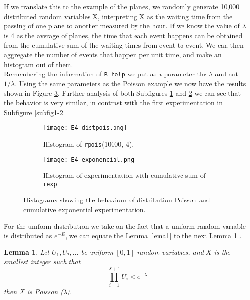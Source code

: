 \documentclass{article}
\newtheorem{lemma}[theorem]{Lemma}
\begin{document}
\smallskip

If we translate this to the example of the planes, we randomly generate 10,000 distributed random variables X, interpreting X as the waiting time from the passing of one plane to another measured by the hour. If we know the value of $\lambda$ is 4 as the average of planes, the time that each event happens can be obtained from the cumulative sum of the waiting times from event to event.  We can then aggregate the number of events that happen per unit time, and make an histogram out of them. \\

Remembering the information of \texttt{R help} we put as a parameter the $\lambda$ and not $1/\lambda$. Using the same parameters as the Poisson example we now have the results shown in Figure \ref{fig2}. Further analysis of both Subfigures \ref{subfig2-1} and \ref{subfig2-2} we can see that the behavior is very similar, in contrast with the first experimentation in Subfigure \ref{subfig1-2}

\begin{figure}[]
\begin{subfigure}{.5\textwidth}
  \centering
  \texttt{[image: E4\_distpois.png]}  
  \caption{Histogram of \texttt{rpois}(10000, 4).}
  \label{subfig2-1}
\end{subfigure}
\begin{subfigure}{.5\textwidth}
  \centering
  \texttt{[image: E4\_exponencial.png]}  
  \caption{Histogram of experimentation with cumulative sum of \texttt{rexp}}
  \label{subfig2-2}
\end{subfigure}
\caption{Histograms showing the behaviour of distribution Poisson and cumulative exponential experimentation.}
\label{fig2}
\end{figure}

\clearpage


For the uniform distribution we take on the fact that a uniform random variable is distributed as $e^{-E}$, we can equate the Lemma \ref{lema1} to the next Lemma \ref{lema2} \cite{randvariates}.

\begin{lemma}\label{lema2}
Let $U_1, U_2, ...$ be uniform $[0,1]$ random variables, and $X$ is the smallest integer such that \\
\begin{equation*}
\prod_{i=1}^{X+1}U_i <e^{-\lambda}
\end{equation*}
then $X$ is Poisson ($\lambda$).
\end{lemma}
\end{document}
